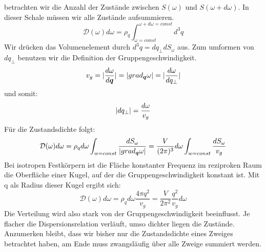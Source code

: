 \documentclass[11pt]{article}
\DeclarePairedDelimiter\abs{\lvert}{\rvert}
\begin{document}
betrachten wir die Anzahl der Zustände zwischen $S(\omega)$ und $S(\omega+d
\omega)$. In dieser Schale müssen wir alle Zustände aufsummieren.
\begin{equation}
  \mathcal{D}(\omega)d\omega=\rho_q
  \int_{\omega=const}^{\omega+d\omega=const}d^3q
\end{equation}
Wir drücken das Volumenelement durch $d^3q=dq_\perp dS_\omega$ aus. Zum
umformen von $dq_\perp$ benutzen wir die Definition der Gruppengeschwindigkeit.
\begin{equation}
  v_g=\abs{\frac{d\omega}{d\bm{q}}}=\abs{grad_{\bm{q}}\omega}=
  \abs{\frac{d\omega}{dq_\perp}}
\end{equation}
und somit:
\begin{equation}
  \abs{dq_\perp}=\frac{d\omega}{v_g}
\end{equation}
Für die Zustandsdichte folgt:
\begin{equation}
  \mathcal{D}(\omega)d\omega=\rho_qd\omega\int_{w=const}\frac{dS_\omega}
  {\abs{grad_{\bm{q}}\omega}}=
  \frac{V}{(2\pi)^3}d\omega\int_{w=const}\frac{dS_\omega}{v_g}
\end{equation}
Bei isotropen Festkörpern ist die Fläche konstanter Frequenz im reziproken Raum
die Oberfläche einer Kugel, auf der die Gruppengeschwindigkeit konstant ist. Mit
q als Radius dieser Kugel ergibt sich:
\begin{equation}
  \mathcal{D}(\omega)d\omega=\rho_qd\omega\frac{4\pi q^2}{v_g}
  =\frac{V}{2\pi^2}\frac{q^2}{v_g}d\omega
\end{equation}
Die Verteilung wird also stark von der Gruppengeschwindigkeit beeinflusst. Je
flacher die Dispersionsrelation verläuft, umso dichter liegen die Zustände.
Anzumerken bleibt, dass wir bisher nur die Zustandsdichte eines Zweiges
betrachtet haben, am Ende muss zwangsläufig über alle Zweige summiert werden.
\end{document}
